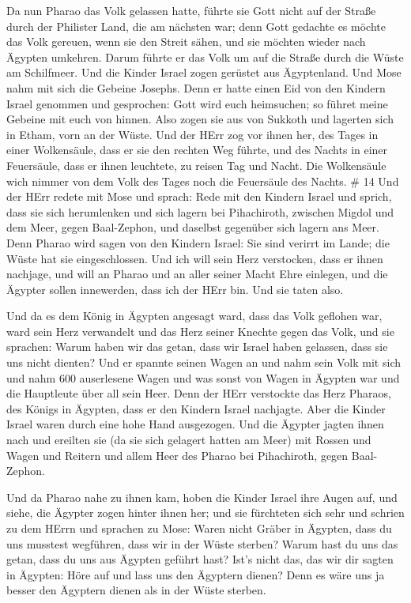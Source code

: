  Da nun Pharao das Volk gelassen hatte, führte sie Gott
nicht auf der Straße durch der Philister Land, die am nächsten war; denn
Gott gedachte es möchte das Volk gereuen, wenn sie den Streit sähen, und
sie möchten wieder nach Ägypten umkehren.  Darum führte er
das Volk um auf die Straße durch die Wüste am Schilfmeer. Und die Kinder
Israel zogen gerüstet aus Ägyptenland.  Und Mose nahm mit
sich die Gebeine Josephs. Denn er hatte einen Eid von den Kindern Israel
genommen und gesprochen: Gott wird euch heimsuchen; so führet meine
Gebeine mit euch von hinnen.  Also zogen sie aus von
Sukkoth und lagerten sich in Etham, vorn an der Wüste.  Und
der HErr zog vor ihnen her, des Tages in einer Wolkensäule, dass er sie
den rechten Weg führte, und des Nachts in einer Feuersäule, dass er
ihnen leuchtete, zu reisen Tag und Nacht.  Die Wolkensäule
wich nimmer von dem Volk des Tages noch die Feuersäule des Nachts. \# 14
 Und der HErr redete mit Mose und sprach:  Rede
mit den Kindern Israel und sprich, dass sie sich herumlenken und sich
lagern bei Pihachiroth, zwischen Migdol und dem Meer, gegen Baal-Zephon,
und daselbst gegenüber sich lagern ans Meer.  Denn Pharao
wird sagen von den Kindern Israel: Sie sind verirrt im Lande; die Wüste
hat sie eingeschlossen.  Und ich will sein Herz verstocken,
dass er ihnen nachjage, und will an Pharao und an aller seiner Macht
Ehre einlegen, und die Ägypter sollen innewerden, dass ich der HErr bin.
Und sie taten also.

 Und da es dem König in Ägypten angesagt ward, dass das Volk
geflohen war, ward sein Herz verwandelt und das Herz seiner Knechte
gegen das Volk, und sie sprachen: Warum haben wir das getan, dass wir
Israel haben gelassen, dass sie uns nicht dienten?  Und er
spannte seinen Wagen an und nahm sein Volk mit sich  und
nahm 600 auserlesene Wagen und was sonst von Wagen in Ägypten war und
die Hauptleute über all sein Heer.  Denn der HErr verstockte
das Herz Pharaos, des Königs in Ägypten, dass er den Kindern Israel
nachjagte. Aber die Kinder Israel waren durch eine hohe Hand ausgezogen.
 Und die Ägypter jagten ihnen nach und ereilten sie (da sie
sich gelagert hatten am Meer) mit Rossen und Wagen und Reitern und allem
Heer des Pharao bei Pihachiroth, gegen Baal-Zephon.

 Und da Pharao nahe zu ihnen kam, hoben die Kinder Israel
ihre Augen auf, und siehe, die Ägypter zogen hinter ihnen her; und sie
fürchteten sich sehr und schrien zu dem HErrn  und sprachen
zu Mose: Waren nicht Gräber in Ägypten, dass du uns musstest wegführen,
dass wir in der Wüste sterben? Warum hast du uns das getan, dass du uns
aus Ägypten geführt hast?  Ist's nicht das, das wir dir
sagten in Ägypten: Höre auf und lass uns den Ägyptern dienen? Denn es
wäre uns ja besser den Ägyptern dienen als in der Wüste sterben.

